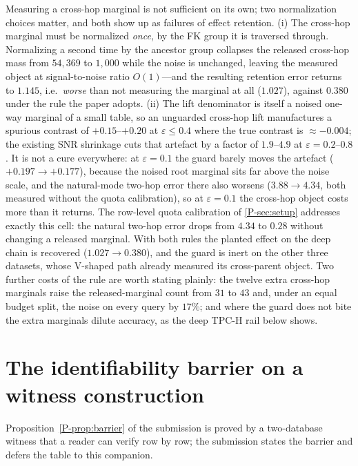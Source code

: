 \documentclass[sigconf, nonacm]{acmart}
\newcommand{\pref}[1]{\ref{P-#1}}
\newcommand{\pprop}[1]{Proposition~\ref{P-prop:#1} of the submission}
\begin{document}
Measuring a cross-hop marginal is not sufficient on its own; two normalization
choices matter, and both show up as failures of effect retention. (i) The
cross-hop marginal must be normalized \emph{once}, by the FK group it is
traversed through. Normalizing a second time by the ancestor group collapses
the released cross-hop mass from $54{,}369$ to $1{,}000$ while the noise is
unchanged, leaving the measured object at signal-to-noise ratio $O(1)$---and
the resulting retention error returns to $1.145$, i.e.\ \emph{worse} than not
measuring the marginal at all ($1.027$), against $0.380$ under the rule the
paper adopts. (ii) The lift denominator is itself a noised one-way marginal of
a small table, so an unguarded cross-hop lift manufactures a spurious contrast
of $+0.15$--$+0.20$ at $\varepsilon\le0.4$ where the true contrast is
$\approx-0.004$; the existing SNR shrinkage cuts that artefact by a factor of
$1.9$--$4.9$ at $\varepsilon{=}0.2$--$0.8$. It is not a cure everywhere: at
$\varepsilon{=}0.1$ the guard barely moves the artefact
($+0.197\to+0.177$), because the noised root marginal sits far above the noise
scale, and the natural-mode two-hop error there also worsens
($3.88\to4.34$, both measured without the quota calibration), so at
$\varepsilon{=}0.1$ the cross-hop object costs more than it returns. The
row-level quota calibration of \pref{sec:setup} addresses exactly this cell:
the natural two-hop error drops from $4.34$ to $0.28$ without changing a
released marginal. With both rules the planted effect on the deep chain is
recovered ($1.027\to0.380$), and the guard is inert on the other three
datasets, whose V-shaped path already measured its cross-parent object. Two
further costs of the rule are worth stating plainly: the twelve extra
cross-hop marginals raise the released-marginal count from $31$ to $43$ and,
under an equal budget split, the noise on every query by $17\%$; and where the
guard does not bite the extra marginals dilute accuracy, as the deep TPC-H
rail below shows.

\section{The identifiability barrier on a witness construction}
\label{app:barrier}

\pprop{barrier} is proved by a two-database witness that a reader can verify
row by row; the submission states the barrier and defers the table to this
companion.
\end{document}
